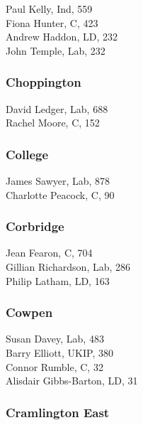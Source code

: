 \documentclass[a4paper,openany,10pt]{book}
\begin{document}
Paul Kelly, Ind, 559\\
Fiona Hunter, C, 423\\
Andrew Haddon, LD, 232\\
John Temple, Lab, 232\\


\subsubsection*{Choppington}



David Ledger, Lab, 688\\
Rachel Moore, C, 152\\


\subsubsection*{College}



James Sawyer, Lab, 878\\
Charlotte Peacock, C, 90\\


\subsubsection*{Corbridge}



Jean Fearon, C, 704\\
Gillian Richardson, Lab, 286\\
Philip Latham, LD, 163\\


\subsubsection*{Cowpen}



Susan Davey, Lab, 483\\
Barry Elliott, UKIP, 380\\
Connor Rumble, C, 32\\
Alisdair Gibbs-Barton, LD, 31\\


\subsubsection*{Cramlington East}
\end{document}
